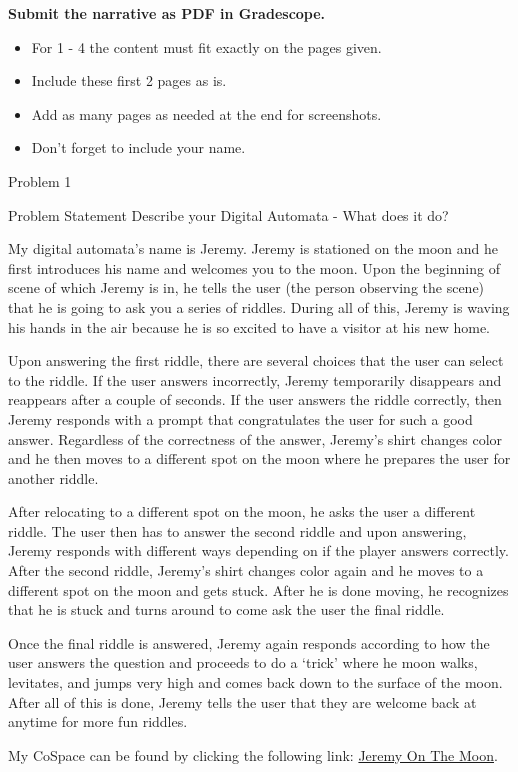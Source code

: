 \textbf{Submit the narrative as PDF in Gradescope.}

\begin{itemize}
    \item For 1 - 4 the content must fit exactly on the pages given.
    \item Include these first 2 pages as is.
    \item Add as many pages as needed at the end for screenshots.
    \item Don’t forget to include your name.
\end{itemize}

\begin{problem}{Problem 1}
    \begin{statement}{Problem Statement}
        Describe your Digital Automata -  What does it do?
    \end{statement}

    \begin{highlight}[Response]
        My digital automata's name is Jeremy. Jeremy is stationed on the moon and he first introduces his name and welcomes you to the moon. Upon the beginning of scene of which Jeremy is in, he tells
        the user (the person observing the scene) that he is going to ask you a series of riddles. During all of this, Jeremy is waving his hands in the air because he is so excited to have a visitor
        at his new home.

        Upon answering the first riddle, there are several choices that the user can select to the riddle. If the user answers incorrectly, Jeremy temporarily disappears and reappears after a couple of
        seconds. If the user answers the riddle correctly, then Jeremy responds with a prompt that congratulates the user for such a good answer. Regardless of the correctness of the answer, Jeremy's
        shirt changes color and he then moves to a different spot on the moon where he prepares the user for another riddle.

        After relocating to a different spot on the moon, he asks the user a different riddle. The user then has to answer the second riddle and upon answering, Jeremy responds with different ways depending
        on if the player answers correctly. After the second riddle, Jeremy's shirt changes color again and he moves to a different spot on the moon and gets stuck. After he is done moving, he recognizes
        that he is stuck and turns around to come ask the user the final riddle.

        Once the final riddle is answered, Jeremy again responds according to how the user answers the question and proceeds to do a `trick' where he moon walks, levitates, and jumps very high and comes
        back down to the surface of the moon. After all of this is done, Jeremy tells the user that they are welcome back at anytime for more fun riddles.

        My CoSpace can be found by clicking the following link: \href{https://edu.cospaces.io/YQK-GCJ}{Jeremy On The Moon}.
    \end{highlight}
\end{problem}

